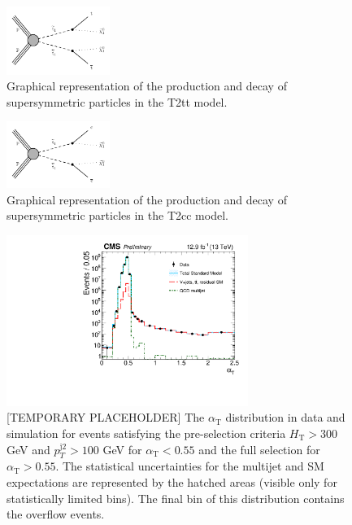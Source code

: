 \begin{figure}[h!] \begin{center}
    \includegraphics[width=0.3\textwidth]{Supplementary/T2tt_feyn_aux}
        \caption{
            Graphical representation of the production and decay of
            supersymmetric particles in the T2tt model.
        }
        \label{fig:simplified-models-feyn-T2tt}
\end{center} \end{figure}

\begin{figure}[h!] \begin{center}
    \includegraphics[width=0.3\textwidth]{Supplementary/T2cc_feyn_aux}
        \caption{
            Graphical representation of the production and decay of
            supersymmetric particles in the T2cc model.
        }
        \label{fig:simplified-models-feyn-T2cc}
\end{center} \end{figure}

\clearpage
\begin{figure}[p]
    \caption{ 
	[TEMPORARY PLACEHOLDER]
    The $\alpha_{\mathrm{T}}$ distribution in data and simulation for events satisfying the
	pre-selection criteria $H_{\mathrm{T}} > 300$ GeV and
	$p_{T}^{\mathrm{j2}} > 100$ GeV for $\alpha_{\mathrm{T}} < 0.55$ and
	the full selection for $\alpha_{\mathrm{T}} > 0.55$.
	The statistical uncertainties for the multijet and SM expectations are represented by the hatched areas (visible only for statistically limited bins).
	 The final bin of this distribution contains the overflow events.
    \label{fig:alphaT} }
  \begin{center}
  \includegraphics[width=0.7\textwidth]{Supplementary/alphaT_aux}
  \end{center}
\end{figure}



